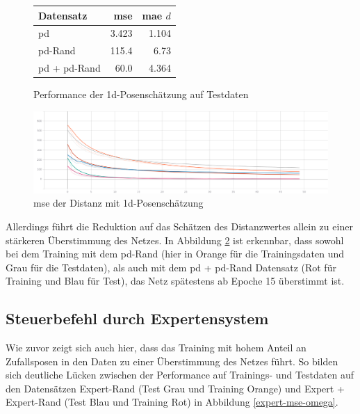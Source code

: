 \begin{figure}[H]
	\centering
	\begin{tabular}[t]{|l|r|r|}
		\hline
		\textbf{Datensatz} & \textbf{\acs{mse}} & \textbf{\acs{mae}} $d$ \\
		\hline
		\acs{pd} & 3.423 & 1.104 \\
		\hline
		\acs{pd}-Rand & 115.4 & 6.73 \\
		\hline
		\acs{pd} + \acs{pd}-Rand & 60.0 & 4.364 \\
		\hline
	\end{tabular}
	\caption{Performance der \acs{1d}-Posenschätzung auf Testdaten}
	\label{1d-pose-performance}
\end{figure}

\begin{figure}[H]
	\centering
	\includegraphics[width=\linewidth]{kapitel5/images/tensorboard/d-only/Loss-d-only.png}
	\caption{\acs{mse} der Distanz mit \acs{1d}-Posenschätzung}
	\label{1d-poses-mse-d}
\end{figure}

Allerdings führt die Reduktion auf das Schätzen des Distanzwertes allein zu einer stärkeren Überstimmung des Netzes. In Abbildung \ref{1d-poses-mse-d} ist erkennbar, dass sowohl bei dem Training mit dem \glqq\acs{pd}-Rand\grqq{} (hier in Orange für die Trainingsdaten und Grau für die Testdaten), als auch mit dem \glqq\acs{pd} + \acs{pd}-Rand\grqq{} Datensatz (Rot für Training und Blau für Test), das Netz spätestens ab Epoche 15 überstimmt ist.

\subsection{Steuerbefehl durch Expertensystem}


Wie zuvor zeigt sich auch hier, dass das Training mit hohem Anteil an Zufallsposen in den Daten zu einer Überstimmung des Netzes führt. So bilden sich deutliche Lücken zwischen der Performance auf Trainings- und Testdaten auf den Datensätzen \glqq Expert-Rand\grqq{} (Test Grau und Training Orange) und \glqq Expert + Expert-Rand\grqq{} (Test Blau und Training Rot) in Abbildung \ref{expert-mse-omega}.


